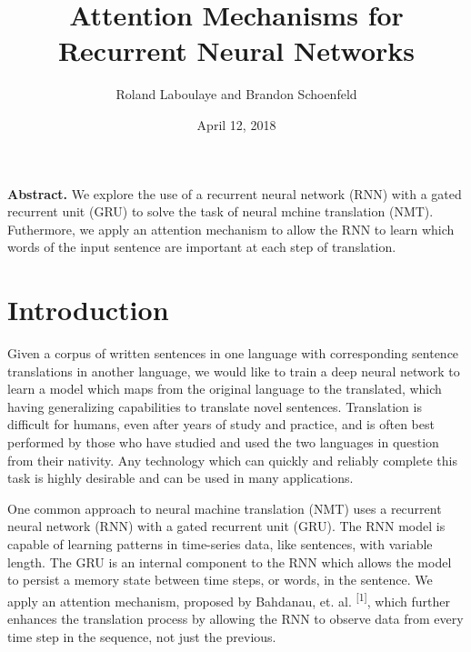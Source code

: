 \documentclass[letterpaper, 11pt]{article}
\begin{document}
\title{Attention Mechanisms for Recurrent Neural Networks}
\author{Roland Laboulaye and Brandon Schoenfeld}
\date{April 12, 2018}
\maketitle

\begin{multicols}{2}

\noindent \textbf{Abstract.}
We explore the use of a recurrent neural network (RNN) with a gated recurrent unit (GRU) to solve
the task of neural mchine translation (NMT). Futhermore, we apply an attention mechanism to allow
the RNN to learn which words of the input sentence are important at each step of translation.

\section{Introduction}
Given a corpus of written sentences in one language with corresponding sentence translations in
another language, we would like to train a deep neural network to learn a model which maps from the
original language to the translated, which having generalizing capabilities to translate novel
sentences.
Translation is difficult for humans, even after years of study and practice, and is often best
performed by those who have studied and used the two languages in question from their nativity.
Any technology which can quickly and reliably complete this task is highly desirable and can be used
in many applications.

One common approach to neural machine translation (NMT) uses a recurrent neural network (RNN) with
a gated recurrent unit (GRU).
The RNN model is capable of learning patterns in time-series data,
like sentences, with variable length.
The GRU is an internal component to the RNN which allows the model to persist a memory state between
time steps, or words, in the sentence.
We apply an attention mechanism, proposed by Bahdanau, et. al. \textsuperscript{[1]}, which further
enhances the translation process by allowing the RNN to observe data from every time step in the
sequence, not just the previous.


\end{multicols}
\end{document}
